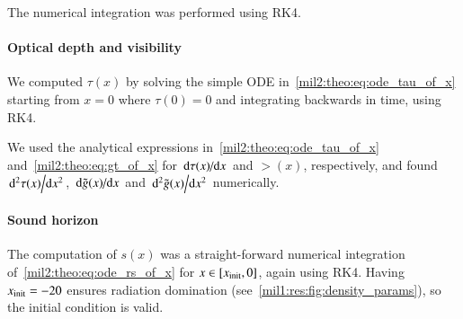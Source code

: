     The numerical integration was performed using RK4.



\paragraph{Optical depth and visibility}
    We computed $\tau(x)$ by solving the simple ODE in~\cref{mil2:theo:eq:ode_tau_of_x} starting from $x=0$ where $\tau(0)=0$ and integrating backwards in time, using RK4. %
    
    We used the analytical expressions in~\cref{mil2:theo:eq:ode_tau_of_x} and~\cref{mil2:theo:eq:gt_of_x} for $\dv*{\tau(x)}{x}$ and $\gt(x)$, respectively, and found $\dv*[2]{\tau(x)}{x}$, $\dv*{\tilde{g}(x)}{x}$ and $\dv*[2]{\tilde{g}(x)}{x}$ numerically. 

\paragraph{Sound horizon}
    The computation of $s(x)$ was a straight-forward numerical integration of~\cref{mil2:theo:eq:ode_rs_of_x} for $x\in[x_\mathrm{init}, 0]$, again using RK4.
    Having $x_\mathrm{init}=-20$ ensures radiation domination (see~\cref{mil1:res:fig:density_params}), so the initial condition is valid.